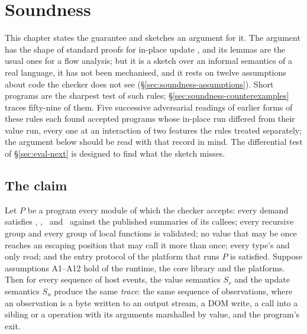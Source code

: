 \chapter{Soundness}
\label{sec:soundness}

This chapter states the guarantee and sketches an argument for it. The argument has the shape of
standard proofs for in-place update \citep{aspinall2008usage,bernardy2018linear}, and its lemmas are
the usual ones for a flow analysis; but it is a sketch over an informal semantics of a real
language, it has not been mechanised, and it rests on twelve assumptions about code the checker does
not see (\S\ref{sec:soundness-assumptions}). Short programs are the sharpest test of such rules;
\S\ref{sec:soundness-counterexamples} traces fifty-nine of them. Five successive adversarial readings of
earlier forms of these rules each found accepted programs whose in-place run differed from their value
run, every one at an interaction of two features the rules treated separately; the argument below should
be read with that record in mind. The differential test of \S\ref{sec:eval-next} is designed to find what
the sketch misses.

\section{The claim}

\begin{theorem}
\label{thm:main}
Let $P$ be a program every module of which the checker accepts: every demand satisfies \Known,
\Unescaped, \Dead\ and \Disjoint\ against the published summaries of its callees; every recursive group
and every group of local functions is validated; no value that may be once reaches an escaping
position that may call it more than once; every type's  and  only read; and the entry protocol of the platform
that runs $P$ is satisfied. Suppose assumptions A1--A12 hold of the runtime, the core library and the
platforms. Then for every sequence of host events, the value semantics $S_v$ and the update semantics
$S_u$ produce the same \emph{trace}: the same sequence of observations, where an observation is a byte
written to an output stream, a DOM write, a call into a  sibling or a  operation
with its arguments marshalled by value, and the program's exit.
\end{theorem}

